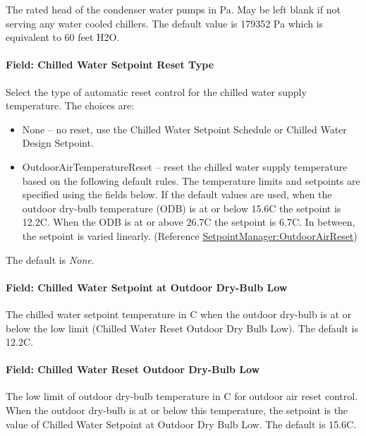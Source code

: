 The rated head of the condenser water pumps in Pa. May be left blank if not serving any water cooled chillers. The default value is 179352 Pa which is equivalent to 60 feet H2O.

\paragraph{Field: Chilled Water Setpoint Reset Type}\label{field-chilled-water-setpoint-reset-type}

Select the type of automatic reset control for the chilled water supply temperature. The choices are:

\begin{itemize}
\item
  None -- no reset, use the Chilled Water Setpoint Schedule or Chilled Water Design Setpoint.
\item
  OutdoorAirTemperatureReset -- reset the chilled water supply temperature based on the following default rules. The temperature limits and setpoints are specified using the fields below. If the default values are used, when the outdoor dry-bulb temperature (ODB) is at or below 15.6C the setpoint is 12.2C. When the ODB is at or above 26.7C the setpoint is 6.7C. In between, the setpoint is varied linearly. (Reference \hyperref[setpointmanageroutdoorairreset]{SetpointManager:OutdoorAirReset})
\end{itemize}

The default is \emph{None}.

\paragraph{Field: Chilled Water Setpoint at Outdoor Dry-Bulb Low}\label{field-chilled-water-setpoint-at-outdoor-dry-bulb-low}

The chilled water setpoint temperature in C when the outdoor dry-bulb is at or below the low limit (Chilled Water Reset Outdoor Dry Bulb Low). The default is 12.2C.

\paragraph{Field: Chilled Water Reset Outdoor Dry-Bulb Low}\label{field-chilled-water-reset-outdoor-dry-bulb-low}

The low limit of outdoor dry-bulb temperature in C for outdoor air reset control. When the outdoor dry-bulb is at or below this temperature, the setpoint is the value of Chilled Water Setpoint at Outdoor Dry Bulb Low. The default is 15.6C.

